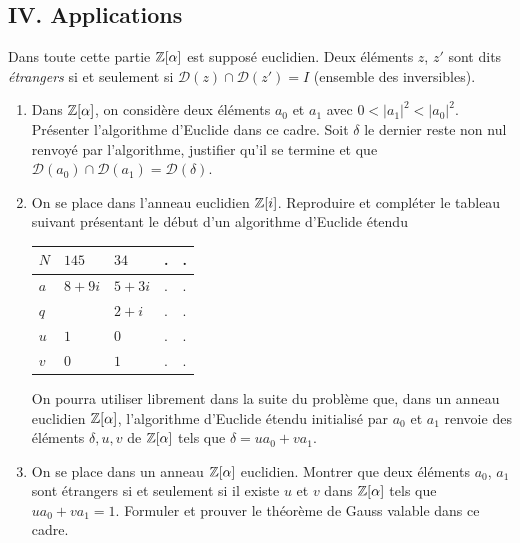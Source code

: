 \subsection*{IV. Applications}
Dans toute cette partie $\mathbb{Z}[\alpha]$ est supposé euclidien. Deux éléments $z$, $z'$ sont dits \emph{étrangers} si et seulement si $\mathcal{D}(z)\cap \mathcal{D}(z') = I$ (ensemble des inversibles).
\begin{enumerate}
  \item Dans $\mathbb{Z}[\alpha]$, on considère deux éléments $a_0$ et $a_1$ avec $0< |a_1|^2 < |a_0|^2$. Présenter l'algorithme d'Euclide dans ce cadre. Soit $\delta$ le dernier reste non nul renvoyé par l'algorithme, justifier qu'il se termine et que $\mathcal{D}(a_0)\cap \mathcal{D}(a_1) = \mathcal{D}(\delta)$.
  \item On se place dans l'anneau euclidien $\mathbb{Z}[i]$. Reproduire et compléter le tableau suivant présentant le début d'un algorithme d'Euclide étendu
  \begin{center}
\begin{tabular}{|l|l|l|l|l|} \hline
$N$ & $145$  & $34$  & . & .\\ \hline
$a$ & $8+9i$ & $5+3i$& . & .\\ \hline
$q$ &        & $2+i$ & . & .\\ \hline
$u$ & $1$    & $0$   & . & .\\ \hline
$v$ & $0$    & $1$   & . & .\\ \hline
  \end{tabular}
  \end{center}
  On pourra utiliser librement dans la suite du problème que, dans un anneau euclidien $\mathbb{Z}[\alpha]$, l'algorithme d'Euclide étendu initialisé par $a_0$ et $a_1$ renvoie des éléments $\delta, u, v$ de $\mathbb{Z}[\alpha]$ tels que $\delta = u a_0 + va_1$.
  
  \item On se place dans un anneau $\mathbb{Z}[\alpha]$ euclidien. Montrer que deux éléments $a_0$, $a_1$ sont étrangers si et seulement si il existe $u$ et $v$ dans $\mathbb{Z}[\alpha]$ tels que $ua_0 + va_1 = 1$. Formuler et prouver le théorème de Gauss valable dans ce cadre.
  

\end{enumerate}
